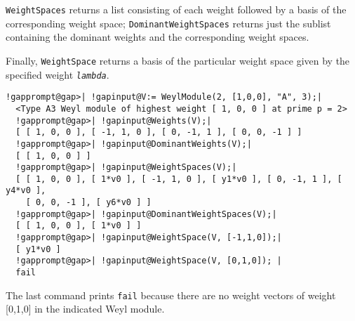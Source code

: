 \documentclass[a4paper,11pt]{report}
\begin{document}
{{{ \texttt{WeightSpaces} returns a list consisting of each weight followed by a basis of the
corresponding weight space; \texttt{DominantWeightSpaces} returns just the sublist containing the dominant weights and the corresponding
weight spaces. 

 Finally, \texttt{WeightSpace} returns a basis of the particular weight space given by the specified weight \mbox{\texttt{\mdseries\slshape lambda}}. 
\begin{Verbatim}[commandchars=!@|,fontsize=\small,frame=single,label=Example]
  !gapprompt@gap>| !gapinput@V:= WeylModule(2, [1,0,0], "A", 3);|
  <Type A3 Weyl module of highest weight [ 1, 0, 0 ] at prime p = 2>
  !gapprompt@gap>| !gapinput@Weights(V);|
  [ [ 1, 0, 0 ], [ -1, 1, 0 ], [ 0, -1, 1 ], [ 0, 0, -1 ] ]
  !gapprompt@gap>| !gapinput@DominantWeights(V);|
  [ [ 1, 0, 0 ] ]
  !gapprompt@gap>| !gapinput@WeightSpaces(V);|
  [ [ 1, 0, 0 ], [ 1*v0 ], [ -1, 1, 0 ], [ y1*v0 ], [ 0, -1, 1 ], [ y4*v0 ], 
    [ 0, 0, -1 ], [ y6*v0 ] ]
  !gapprompt@gap>| !gapinput@DominantWeightSpaces(V);|
  [ [ 1, 0, 0 ], [ 1*v0 ] ]
  !gapprompt@gap>| !gapinput@WeightSpace(V, [-1,1,0]);|
  [ y1*v0 ]
  !gapprompt@gap>| !gapinput@WeightSpace(V, [0,1,0]); |
  fail
\end{Verbatim}
 The last command prints \texttt{fail} because there are no weight vectors of weight [0,1,0] in the indicated Weyl
module. }

 }

 }

 
\end{document}
